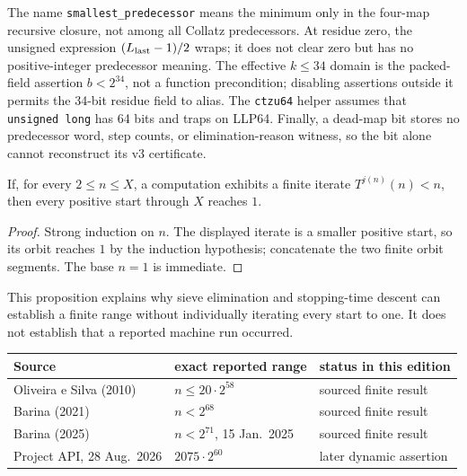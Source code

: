 \begin{sourceissue}
\label{sourceissue:Barina-code-boundaries}
The name \texttt{smallest\_predecessor} means the minimum only in the
four-map recursive closure, not among all Collatz predecessors.  At residue
zero, the unsigned expression $(L_{\rm last}-1)/2$ wraps; it does not clear
zero but has no positive-integer predecessor meaning.  The effective
$k\leq34$ domain is the packed-field assertion $b<2^{34}$, not a function
precondition; disabling assertions outside it permits the 34-bit residue
field to alias.  The \texttt{ctzu64} helper assumes that
\texttt{unsigned long} has 64 bits and traps on LLP64.  Finally, a dead-map
bit stores no predecessor word, step counts, or elimination-reason witness,
so the bit alone cannot reconstruct its v3 certificate.
\end{sourceissue}

\begin{proposition}
\label{prop:finite-descent-induction}
If, for every $2\leq n\leq X$, a computation exhibits a finite iterate
$T^{j(n)}(n)<n$, then every positive start through $X$ reaches $1$.
\end{proposition}

\begin{proof}
Strong induction on $n$.  The displayed iterate is a smaller positive start,
so its orbit reaches $1$ by the induction hypothesis; concatenate the two
finite orbit segments.  The base $n=1$ is immediate.
\end{proof}

This proposition explains why sieve elimination and stopping-time descent
can establish a finite range without individually iterating every start to
one.  It does not establish that a reported machine run occurred.

\begin{center}
\begin{tabular}{@{}lll@{}}
\toprule
Source & exact reported range & status in this edition\\
\midrule
Oliveira e Silva (2010) & $n\leq20\cdot2^{58}$ & sourced finite result\\
Barina (2021) & $n<2^{68}$ & sourced finite result\\
Barina (2025) & $n<2^{71}$, 15 Jan.\ 2025 & sourced finite result\\
Project API, 28 Aug.\ 2026 & $2075\cdot2^{60}$ & later dynamic assertion\\
\bottomrule
\end{tabular}
\end{center}

